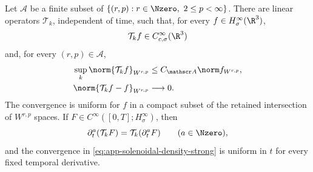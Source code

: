 \begin{lemma}
\label{lem:app-solenoidal-density}
Let \(\mathscr A\) be a finite subset of
\(\{(r,p):r\in\Nzero,\ 2\le p<\infty\}\).  There are linear operators
\(\mathcal T_k\), independent of time, such that, for every
\(f\in H^\infty_\sigma(\R^3)\),
\[
 \mathcal T_kf\in C_{c,\sigma}^\infty(\R^3)
\]
and, for every \((r,p)\in\mathscr A\),
\begin{align}
 \sup_k\norm{\mathcal T_kf}_{W^{r,p}}
 &\le C_{\mathscr A}\norm f_{W^{r,p}},
 \label{eq:app-solenoidal-density-uniform}\\
 \norm{\mathcal T_kf-f}_{W^{r,p}}&\longrightarrow0.
 \label{eq:app-solenoidal-density-strong}
\end{align}
The convergence is uniform for \(f\) in a compact subset of the retained
intersection of \(W^{r,p}\) spaces.  If
\(F\in C^\infty([0,T];H^\infty_\sigma)\), then
\begin{equation}
 \partial_t^a(\mathcal T_kF)=\mathcal T_k(\partial_t^aF)
 \qquad(a\in\Nzero),
 \label{eq:app-solenoidal-density-time}
\end{equation}
and the convergence in
\eqref{eq:app-solenoidal-density-strong} is uniform in \(t\) for every
fixed temporal derivative.
\end{lemma}

